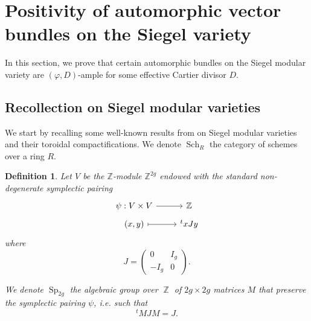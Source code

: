 \documentclass[11pt]{amsart}
\numberwithin{subsection}{section}
\numberwithin{figure}{section}
\numberwithin{table}{section}
\theoremstyle{1}
\newtheorem{definition}[theorem]{Definition}
\theoremstyle{2}
\DeclareMathOperator{\Z}{\mathbb{Z}}
\DeclareMathOperator{\Sch}{Sch}
\DeclareMathOperator{\Sp}{Sp}
\begin{document}
\section{Positivity of automorphic vector bundles on the Siegel variety}\label{sect_auto}
In this section, we prove that certain automorphic bundles on the Siegel modular variety are $(\varphi,D)$-ample for some effective Cartier divisor $D$.
\subsection{Recollection on Siegel modular varieties}
We start by recalling some well-known results from \cite{MR1083353} on Siegel modular varieties and their toroidal compactifications. We denote $\Sch_{R}$ the category of schemes over a ring $R$.
\begin{definition}\label{def7}
Let $V$ be the $\mathbb{Z}$-module $\mathbb{Z}^{2g}$ endowed with the standard non-degenerate symplectic pairing
\begin{equation*}
\begin{tikzcd}[row sep =tiny]
\psi : V \times V \arrow[r]& \mathbb{Z} \\
(x,y) \arrow[r,mapsto] & {}^txJy
\end{tikzcd}
\end{equation*}
where
\begin{equation*}
J = \begin{pmatrix}
0 & I_g \\
-I_g & 0 
\end{pmatrix}.
\end{equation*}
\vspace*{0.0cm}

We denote $\Sp_{2g}$ the algebraic group over $\Z$ of $2g \times 2g$ matrices $M$ that preserve the symplectic pairing $\psi$, i.e. such that
\begin{equation*}
{}^tMJM = J.
\end{equation*}
\end{definition}
\end{document}
